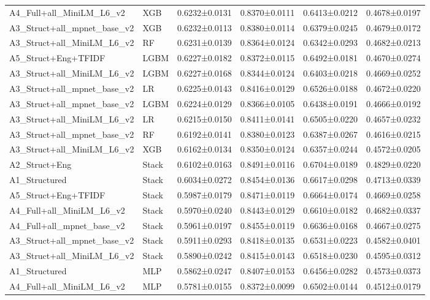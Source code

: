 \begin{table}
\begin{tabular}{llcccc}
A4_Full+all_MiniLM_L6_v2 & XGB & 0.6232±0.0131 & 0.8370±0.0111 & 0.6413±0.0212 & 0.4678±0.0197 \\
A3_Struct+all_mpnet_base_v2 & XGB & 0.6232±0.0113 & 0.8380±0.0114 & 0.6379±0.0245 & 0.4679±0.0172 \\
A3_Struct+all_MiniLM_L6_v2 & RF & 0.6231±0.0139 & 0.8364±0.0124 & 0.6342±0.0293 & 0.4682±0.0213 \\
A5_Struct+Eng+TFIDF & LGBM & 0.6227±0.0182 & 0.8372±0.0115 & 0.6492±0.0181 & 0.4670±0.0274 \\
A3_Struct+all_MiniLM_L6_v2 & LGBM & 0.6227±0.0168 & 0.8344±0.0124 & 0.6403±0.0218 & 0.4669±0.0252 \\
A3_Struct+all_mpnet_base_v2 & LR & 0.6225±0.0143 & 0.8416±0.0129 & 0.6526±0.0188 & 0.4672±0.0220 \\
A3_Struct+all_mpnet_base_v2 & LGBM & 0.6224±0.0129 & 0.8366±0.0105 & 0.6438±0.0191 & 0.4666±0.0192 \\
A3_Struct+all_MiniLM_L6_v2 & LR & 0.6215±0.0150 & 0.8411±0.0141 & 0.6505±0.0220 & 0.4657±0.0232 \\
A3_Struct+all_mpnet_base_v2 & RF & 0.6192±0.0141 & 0.8380±0.0123 & 0.6387±0.0267 & 0.4616±0.0215 \\
A3_Struct+all_MiniLM_L6_v2 & XGB & 0.6162±0.0134 & 0.8350±0.0124 & 0.6357±0.0244 & 0.4572±0.0205 \\
A2_Struct+Eng & Stack & 0.6102±0.0163 & 0.8491±0.0116 & 0.6704±0.0189 & 0.4829±0.0220 \\
A1_Structured & Stack & 0.6034±0.0272 & 0.8454±0.0136 & 0.6617±0.0298 & 0.4713±0.0339 \\
A5_Struct+Eng+TFIDF & Stack & 0.5987±0.0179 & 0.8471±0.0119 & 0.6664±0.0174 & 0.4669±0.0258 \\
A4_Full+all_MiniLM_L6_v2 & Stack & 0.5970±0.0240 & 0.8443±0.0129 & 0.6610±0.0182 & 0.4682±0.0337 \\
A4_Full+all_mpnet_base_v2 & Stack & 0.5961±0.0197 & 0.8455±0.0119 & 0.6636±0.0168 & 0.4667±0.0275 \\
A3_Struct+all_mpnet_base_v2 & Stack & 0.5911±0.0293 & 0.8418±0.0135 & 0.6531±0.0223 & 0.4582±0.0401 \\
A3_Struct+all_MiniLM_L6_v2 & Stack & 0.5890±0.0242 & 0.8415±0.0143 & 0.6518±0.0230 & 0.4595±0.0312 \\
A1_Structured & MLP & 0.5862±0.0247 & 0.8407±0.0153 & 0.6456±0.0282 & 0.4573±0.0373 \\
A4_Full+all_MiniLM_L6_v2 & MLP & 0.5781±0.0155 & 0.8372±0.0099 & 0.6502±0.0144 & 0.4512±0.0179 \\

\end{tabular}
\end{table}
